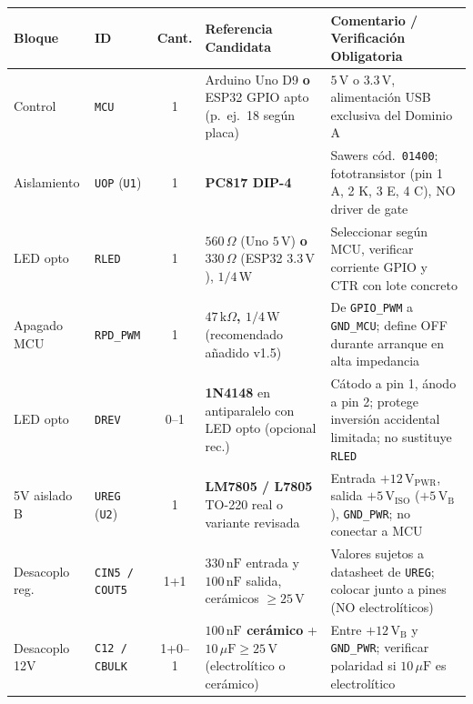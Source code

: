 \documentclass[10pt, a4paper, landscape]{article}
\begin{document}
\par\vspace{0.1cm}\noindent
\renewcommand{\arraystretch}{1.14}
{\footnotesize
\begin{tabularx}{\linewidth}{|>{\raggedright\arraybackslash}p{2.5cm}|>{\raggedright\arraybackslash}p{2.2cm}|c|>{\raggedright\arraybackslash}p{7.4cm}|>{\raggedright\arraybackslash}X|}
\hline
\rowcolor{ucbgray}
\textbf{Bloque} & \textbf{ID} & \textbf{Cant.} & \textbf{Referencia Candidata} & \textbf{Comentario / Verificación Obligatoria} \\ \hline
Control & \texttt{MCU} & 1 & Arduino Uno D9 \textbf{o} ESP32 GPIO apto (p.\ ej.\ 18 según placa) & $5\,\text{V}$ o $3.3\,\text{V}$, alimentación USB exclusiva del Dominio A \\ \hline
Aislamiento & \texttt{UOP} (\texttt{U1}) & 1 & \textbf{PC817 DIP-4} & Sawers cód.\ \texttt{01400}; fototransistor (pin 1 A, 2 K, 3 E, 4 C), NO driver de gate \\ \hline
LED opto & \texttt{RLED} & 1 & \textbf{$560\,\Omega$} (Uno $5\,\text{V}$) \textbf{o $330\,\Omega$} (ESP32 $3.3\,\text{V}$), $1/4\,\text{W}$ & Seleccionar según MCU, verificar corriente GPIO y CTR con lote concreto \\ \hline
Apagado MCU & \texttt{RPD\_PWM} & 1 & \textbf{$47\,\text{k}\Omega$, $1/4\,\text{W}$} (recomendado añadido v1.5) & De \texttt{GPIO\_PWM} a \texttt{GND\_MCU}; define OFF durante arranque en alta impedancia \\ \hline
LED opto & \texttt{DREV} & 0--1 & \textbf{1N4148} en antiparalelo con LED opto (opcional rec.) & Cátodo a pin 1, ánodo a pin 2; protege inversión accidental limitada; no sustituye \texttt{RLED} \\ \hline
5V aislado B & \texttt{UREG} (\texttt{U2}) & 1 & \textbf{LM7805 / L7805} TO-220 real o variante revisada & Entrada $+12\,\text{V}_{\text{PWR}}$, salida $+5\,\text{V}_{\text{ISO}}$ ($+5\,\text{V}_{\text{B}}$), \texttt{GND\_PWR}; no conectar a MCU \\ \hline
Desacoplo reg. & \texttt{CIN5 / COUT5} & 1+1 & \textbf{$330\,\text{nF}$} entrada y \textbf{$100\,\text{nF}$} salida, cerámicos $\ge 25\,\text{V}$ & Valores sujetos a datasheet de \texttt{UREG}; colocar junto a pines (NO electrolíticos) \\ \hline
Desacoplo 12V & \texttt{C12 / CBULK} & 1+0--1 & \textbf{$100\,\text{nF}$ cerámico} + \textbf{$10\,\mu\text{F} \ge 25\,\text{V}$} (electrolítico o cerámico) & Entre $+12\,\text{V}_{\text{B}}$ y \texttt{GND\_PWR}; verificar polaridad si $10\,\mu\text{F}$ es electrolítico \\ \hline

\end{tabularx}}
\end{document}
